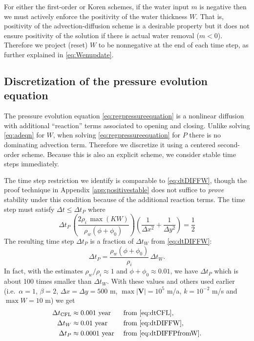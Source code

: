 \documentclass[11pt,final]{amsart}
\newcommand\bV{\mathbf{V}}
\begin{document}
For either the first-order or Koren schemes, if the water input $m$ is negative then we must actively enforce the positivity of the water thickness $W$.  That is, positivity of the advection-diffusion scheme is a desirable property but it does not ensure positivity of the solution if there is actual water removal ($m < 0$).  Therefore we project (reset) $W$ to be nonnegative at the end of each time step, as further explained in \eqref{eq:Wenupdate}.

\subsection*{Discretization of the pressure evolution equation}  The pressure evolution equation \eqref{eq:regpressureequation} is a nonlinear diffusion with additional ``reaction'' terms associated to opening and closing.  Unlike solving \eqref{eq:adeqn} for $W$, when solving \eqref{eq:regpressureequation} for $P$ there is no dominating advection term.  Therefore we discretize it using a centered second-order scheme.  Because this is also an explicit scheme, we consider stable time steps immediately.

The time step restriction we identify is comparable to \eqref{eq:dtDIFFW}, though the proof technique in Appendix \ref{app:positivestable} does not suffice to \emph{prove} stability under this condition because of the additional reaction terms.  The time step must satisfy $\Delta t \le \Delta t_P$ where
\begin{equation}
\Delta t_P\, \left(\frac{2 \rho_i\, \max(K W)}{\rho_w (\phi+\phi_0)}\right) \left(\frac{1}{\Delta x^2} + \frac{1}{\Delta y^2}\right) = \frac{1}{2} \label{eq:dtDIFFP}
\end{equation}
The resulting time step $\Delta t_P$ is a fraction of $\Delta t_W$ from \eqref{eq:dtDIFFW}:
\begin{equation}
\Delta t_P = \frac{\rho_w (\phi+\phi_0)}{\rho_i}\, \Delta t_W.  \label{eq:dtDIFFPfromW}
\end{equation}
In fact, with the estimates $\rho_w/\rho_i \approx 1$ and $\phi+\phi_0 \approx 0.01$, we have $\Delta t_P$ which is about 100 times smaller than $\Delta t_W$.  With these values and others used earlier (i.e.~$\alpha=1$, $\beta=2$, $\Delta x = \Delta y = 500$ m, $\max |\bV|=10^5$ m/a, $k=10^{-2}$ m/s and $\max W=10$ m) we get
\begin{align*}
  \Delta t_{\text{CFL}} &\approx 0.001  \text{ year} &&\text{ from \eqref{eq:dtCFL}}, \\
  \Delta t_W            &\approx 0.01   \text{ year} &&\text{ from \eqref{eq:dtDIFFW}}, \\
  \Delta t_P            &\approx 0.0001 \text{ year} &&\text{ from \eqref{eq:dtDIFFPfromW}.}
\end{align*}
\end{document}
